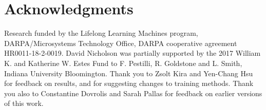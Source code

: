 \documentclass[10pt,letterpaper]{article}
\begin{document}
\section{Acknowledgments}
Research funded by the Lifelong Learning Machines program, 
DARPA/Microsystems Technology Office, DARPA cooperative agreement HR0011-18-2-0019.
David Nicholson was partially supported by the 2017 William K. and Katherine W. Estes Fund
to F. Pestilli, R. Goldstone and L. Smith, Indiana University Bloomington.
Thank you to Zsolt Kira and Yen-Chang Hsu for feedback on results,
and for suggesting changes to training methods.
Thank you also to Constantine Dovrolis and Sarah Pallas for feedback on earlier versions 
of this work.



\setlength{\bibleftmargin}{.125in}
\setlength{\bibindent}{-\bibleftmargin}


\end{document}
